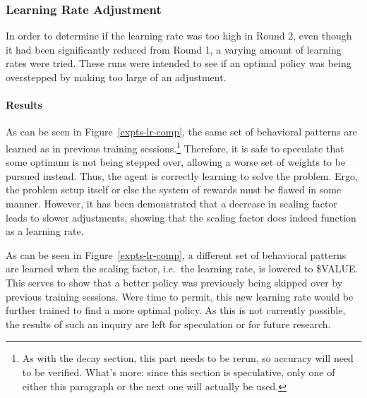 
\subsubsection*{Learning Rate Adjustment}
\label{sec:findings-expts-learnrate}

In order to determine if the learning rate was too high in Round 2,
even though it had been significantly reduced from Round 1,
a varying amount of learning rates were tried.
%
These runs were intended to see if an optimal policy was being overstepped by
making too large of an adjustment.


\paragraph*{Results}




As can be seen in Figure~\ref{expts-lr-comp},
the same set of behavioral patterns are learned as in previous training
sessions.\footnote{
	As with the decay section,
	this part needs to be rerun,
	so accuracy will need to be verified.
	What's more: since this section is speculative,
	only one of either this paragraph or the next one will actually be used.
}
%
Therefore,
it is safe to speculate that some optimum is not being stepped over,
allowing a worse set of weights to be pursued instead.
%
Thus,
the agent is correctly learning to solve the problem.
%
Ergo,
the problem setup itself or else the system of rewards
must be flawed in some manner.
%
However,
it has been demonstrated that
a decrease in scaling factor leads to slower adjustments,
showing that the scaling factor does indeed function as a learning rate.


As can be seen in Figure~\ref{expts-lr-comp},
a different set of behavioral patterns are learned when the
scaling factor,
i.e.\  the learning rate,
is lowered to \${VALUE}. %
%
This serves to show that a better policy was previously being skipped over
by previous training sessions.
%
Were time to permit,
this new learning rate would be further trained to find a more optimal
policy.
%
As this is not currently possible,
the results of such an inquiry are left for speculation
or for future research.



